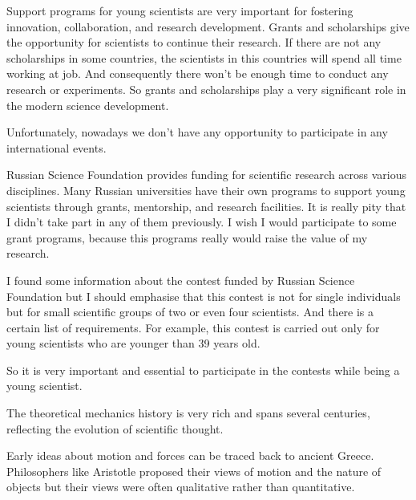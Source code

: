 \documentclass[main.tex]{subfiles}
\begin{document}
\setcounter{subsection}{5}

Support programs for young scientists are very important for fostering innovation, collaboration, and research development.
Grants and scholarships give the opportunity for scientists to continue their research.
If there are not any scholarships in some countries, the scientists in this countries will spend all time working at job.
And consequently there won't be enough time to conduct any research or experiments.
So grants and scholarships play a very significant role in the modern science development.

Unfortunately, nowadays we don't have any opportunity to participate in any international events.

Russian Science Foundation provides funding for scientific research across various disciplines.
Many Russian universities have their own programs to support young scientists through grants, mentorship, and research facilities.
It is really pity that I didn't take part in any of them previously.
I wish I would participate to some grant programs, because this programs really would raise the value of my research.

I found some information about the contest funded by Russian Science Foundation but I should emphasise that this contest is not for single individuals but for small scientific groups of two or even four scientists.
And there is a certain list of requirements.
For example, this contest is carried out only for young scientists who are younger than 39 years old.

So it is very important and essential to participate in the contests while being a young scientist.
\\


\newpage

\setcounter{subsection}{6}

The theoretical mechanics history is very rich and spans several centuries, reflecting the evolution of scientific thought.

Early ideas about motion and forces can be traced back to ancient Greece.
Philosophers like Aristotle proposed their views of motion and the nature of objects but their views were often qualitative rather than quantitative.
\end{document}

